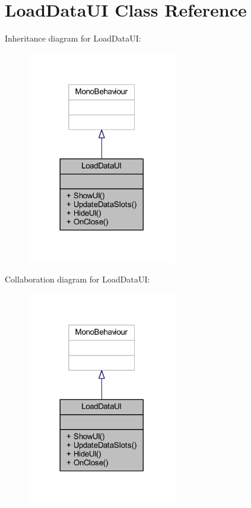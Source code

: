 \hypertarget{class_load_data_u_i}{}\section{Load\+Data\+UI Class Reference}
\label{class_load_data_u_i}


Inheritance diagram for Load\+Data\+UI\+:
\nopagebreak
\begin{figure}[H]
\begin{center}
\leavevmode
\includegraphics[width=185pt]{class_load_data_u_i__inherit__graph}
\end{center}
\end{figure}


Collaboration diagram for Load\+Data\+UI\+:
\nopagebreak
\begin{figure}[H]
\begin{center}
\leavevmode
\includegraphics[width=185pt]{class_load_data_u_i__coll__graph}
\end{center}
\end{figure}
